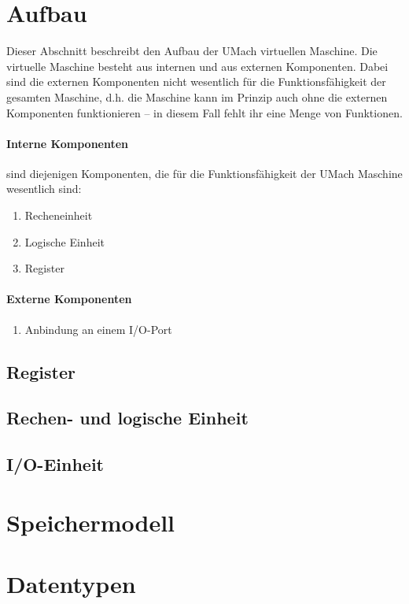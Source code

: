 \section{Aufbau}
Dieser Abschnitt beschreibt den Aufbau der UMach virtuellen Maschine.
Die virtuelle Maschine besteht aus internen und aus externen Komponenten. Dabei
sind die externen Komponenten nicht wesentlich für die Funktionsfähigkeit der
gesamten Maschine, d.h. die Maschine kann im Prinzip auch ohne die externen
Komponenten funktionieren -- in diesem Fall fehlt ihr eine Menge von Funktionen.

\paragraph{Interne Komponenten}
sind diejenigen Komponenten, die für die Funktionsfähigkeit der UMach
Maschine wesentlich sind:
\begin{enumerate}
  \item Recheneinheit
  \item Logische Einheit
  \item Register
\end{enumerate}


\paragraph{Externe Komponenten}

\begin{enumerate}
  \item Anbindung an einem I/O-Port
\end{enumerate}


\subsection{Register}
\blindtext

\subsection{Rechen- und logische Einheit}
\blindtext

\subsection{I/O-Einheit}
\blindtext



\section{Speichermodell}
\blindtext

\section{Datentypen}
\blindtext


